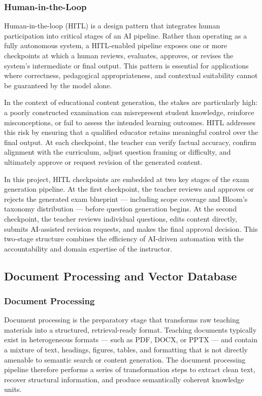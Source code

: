 \documentclass[12pt,a4paper]{article}
\begin{document}
\subsubsection{Human-in-the-Loop}

Human-in-the-loop (HITL) is a design pattern that integrates human participation into critical stages of an AI pipeline. Rather than operating as a fully autonomous system, a HITL-enabled pipeline exposes one or more checkpoints at which a human reviews, evaluates, approves, or revises the system's intermediate or final output. This pattern is essential for applications where correctness, pedagogical appropriateness, and contextual suitability cannot be guaranteed by the model alone.

In the context of educational content generation, the stakes are particularly high: a poorly constructed examination can misrepresent student knowledge, reinforce misconceptions, or fail to assess the intended learning outcomes. HITL addresses this risk by ensuring that a qualified educator retains meaningful control over the final output. At each checkpoint, the teacher can verify factual accuracy, confirm alignment with the curriculum, adjust question framing or difficulty, and ultimately approve or request revision of the generated content.

In this project, HITL checkpoints are embedded at two key stages of the exam generation pipeline. At the first checkpoint, the teacher reviews and approves or rejects the generated exam blueprint — including scope coverage and Bloom's taxonomy distribution — before question generation begins. At the second checkpoint, the teacher reviews individual questions, edits content directly, submits AI-assisted revision requests, and makes the final approval decision. This two-stage structure combines the efficiency of AI-driven automation with the accountability and domain expertise of the instructor.

\subsection{Document Processing and Vector Database}

\subsubsection{Document Processing}

Document processing is the preparatory stage that transforms raw teaching materials into a structured, retrieval-ready format. Teaching documents typically exist in heterogeneous formats — such as PDF, DOCX, or PPTX — and contain a mixture of text, headings, figures, tables, and formatting that is not directly amenable to semantic search or content generation. The document processing pipeline therefore performs a series of transformation steps to extract clean text, recover structural information, and produce semantically coherent knowledge units.
\end{document}

